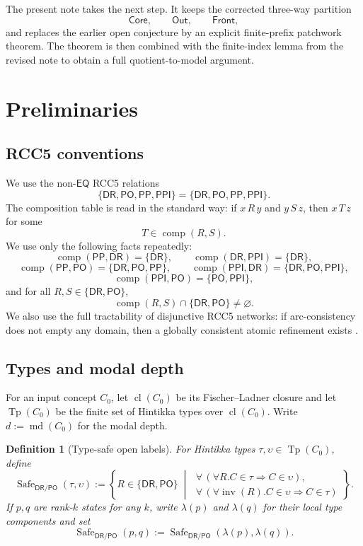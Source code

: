 \documentclass[11pt]{article}
\newtheorem{definition}{Definition}[section]
\theoremstyle{remark}
\newcommand{\DR}{\mathsf{DR}}
\newcommand{\PO}{\mathsf{PO}}
\newcommand{\PP}{\mathsf{PP}}
\newcommand{\PPI}{\mathsf{PPI}}
\newcommand{\EQ}{\mathsf{EQ}}
\newcommand{\RCC}{\{\DR,\PO,\PP,\PPI\}}
\newcommand{\cl}{\operatorname{cl}}
\newcommand{\Tp}{\operatorname{Tp}}
\newcommand{\comp}{\operatorname{comp}}
\newcommand{\inv}{\operatorname{inv}}
\newcommand{\Core}{\mathsf{Core}}
\newcommand{\Out}{\mathsf{Out}}
\newcommand{\Front}{\mathsf{Front}}
\newcommand{\md}{\operatorname{md}}
\begin{document}
The present note takes the next step. It keeps the corrected three-way partition
\[
\Core,\qquad \Out,\qquad \Front,
\]
and replaces the earlier open conjecture by an explicit finite-prefix patchwork theorem. The theorem is then combined with the finite-index lemma from the revised note to obtain a full quotient-to-model argument.

\section{Preliminaries}

\subsection{RCC5 conventions}

We use the non-$\EQ$ RCC5 relations
\[
\RCC=\{\DR,\PO,\PP,\PPI\}.
\]
The composition table is read in the standard way: if $x\,R\,y$ and $y\,S\,z$, then $x\,T\,z$ for some
\[
T\in \comp(R,S).
\]
We use only the following facts repeatedly:
\[
\comp(\PP,\DR)=\{\DR\},\qquad \comp(\DR,\PPI)=\{\DR\},
\]
\[
\comp(\PP,\PO)=\{\DR,\PO,\PP\},\qquad \comp(\PPI,\DR)=\{\DR,\PO,\PPI\},
\]
\[
\comp(\PPI,\PO)=\{\PO,\PPI\},
\]
and for all $R,S\in\{\DR,\PO\}$,
\[
\comp(R,S)\cap\{\DR,\PO\}\neq\varnothing.
\]
We also use the full tractability of disjunctive RCC5 networks: if arc-consistency does not empty any domain, then a globally consistent atomic refinement exists \cite{TwoTier3,Wessel2003}.

\subsection{Types and modal depth}

For an input concept $C_0$, let $\cl(C_0)$ be its Fischer--Ladner closure and let $\Tp(C_0)$ be the finite set of Hintikka types over $\cl(C_0)$. Write $d:=\md(C_0)$ for the modal depth.

\begin{definition}[Type-safe open labels]\label{def:type-safe-open}
For Hintikka types $\tau,\upsilon\in\Tp(C_0)$, define
\[
\operatorname{Safe}_{\DR/\PO}(\tau,\upsilon)
:=
\left\{R\in\{\DR,\PO\}\;\middle|\;
\begin{array}{l}
\forall\, (\forall R.C\in \tau \Rightarrow C\in \upsilon),\\[1mm]
\forall\, (\forall \inv(R).C\in \upsilon \Rightarrow C\in \tau)
\end{array}
\right\}.
\]
If $p,q$ are rank-$k$ states for any $k$, write $\lambda(p)$ and $\lambda(q)$ for their local type components and set
\[
\operatorname{Safe}_{\DR/\PO}(p,q):=\operatorname{Safe}_{\DR/\PO}(\lambda(p),\lambda(q)).
\]
\end{definition}
\end{document}
